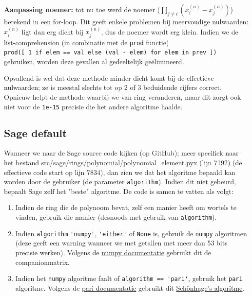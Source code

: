 \documentclass{article}
\begin{document}
\textbf{Aanpassing noemer:} tot nu toe werd de noemer (\(\prod_{j \neq i}{\left(x^{(n)}_i - x^{(n)}_j\right)}\)) berekend in een for-loop. Dit geeft enkele problemen bij meervoudige nulwaarden: \(x^{(n)}_i\) ligt dan erg dicht bij \(x^{(n)}_j\), dus de noemer wordt erg klein. Indien we de list-comprehension (in combinatie met de \verb|prod| functie)\\
\verb|prod([ 1 if elem == val else (val - elem) for elem in prev ])|\\
gebruiken, worden deze gevallen al gedeeltelijk ge\"elimineerd.

Opvallend is wel dat deze methode minder dicht komt bij de effectieve nulwaarden; ze is meestal slechts tot op 2 of 3 beduidende cijfers correct. Opnieuw helpt de methode waarbij we van ring veranderen, maar dit zorgt ook niet voor de \verb|1e-15| precisie die het andere algoritme haalde.

\subsection{Sage default}
Wanneer we naar de Sage source code kijken (op GitHub); meer specifiek naar het bestand \href{https://github.com/sagemath/sage/blob/de32db6991a5293f037bb35d12890152a8ab99e6/src/sage/rings/polynomial/polynomial_element.pyx}{src/sage/rings/polynomial/polynomial\_element.pyx (lijn 7192)} (de effectieve code start op lijn 7834), dan zien we dat het algoritme bepaald kan worden door de gebruiker (de parameter \verb|algorithm|). Indien dit niet gebeurd, bepaalt Sage zelf het "beste" algoritme. De code is samen te vatten als volgt:
\begin{enumerate}
 \item Indien de ring die de polynoom bevat, zelf een manier heeft om wortels te vinden, gebruik die manier (desnoods met gebruik van \verb|algorithm|).
 \item Indien \verb|algorithm| \verb|'numpy'|, \verb|'either'| of \verb|None| is, gebruik de \verb|numpy| algoritmen (deze geeft een warning wanneer we met getallen met meer dan 53 bits precisie werken). Volgens de \href{https://numpy.org/doc/stable/reference/generated/numpy.roots.html}{numpy documentatie} gebruikt dit de companionmatrix.
 \item Indien het \verb|numpy| algoritme faalt of \verb|algorithm == 'pari'|, gebruik het \verb|pari| algoritme. Volgens de \href{https://pari.math.u-bordeaux.fr/dochtml/html/Polynomials_and_power_series.html#polroots}{pari documentatie} gebruikt dit \href{https://en.wikipedia.org/wiki/Splitting_circle_method}{Sch\"onhage's algoritme}.
\end{enumerate}
\end{document}

